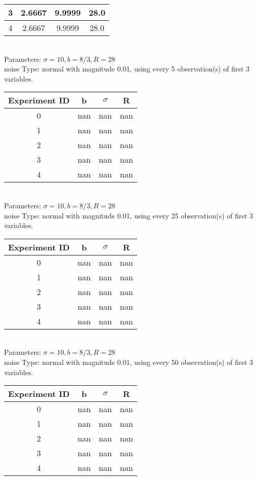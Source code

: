 \begin{multicols}{3}
\begin{tabular}{cccc}
 3 & 2.6667 & 9.9999 & 28.0\\ \hline 
 4 & 2.6667 & 9.9999 & 28.0\\ \hline 
 \end{tabular}\\
Parameters: $\sigma=10, b=8/3, R=28$\\
noise Type: normal with magnitude 0.01, using every 5 observation(s) of first 3 variables.\\
\begin{tabular}{cccc}
\hline Experiment ID & b & $\sigma$ & R \\ \hline 
0 & nan & nan & nan\\ \hline 
 1 & nan & nan & nan\\ \hline 
 2 & nan & nan & nan\\ \hline 
 3 & nan & nan & nan\\ \hline 
 4 & nan & nan & nan\\ \hline 
 \end{tabular}\\
Parameters: $\sigma=10, b=8/3, R=28$\\
noise Type: normal with magnitude 0.01, using every 25 observation(s) of first 3 variables.\\
\begin{tabular}{cccc}
\hline Experiment ID & b & $\sigma$ & R \\ \hline 
0 & nan & nan & nan\\ \hline 
 1 & nan & nan & nan\\ \hline 
 2 & nan & nan & nan\\ \hline 
 3 & nan & nan & nan\\ \hline 
 4 & nan & nan & nan\\ \hline 
 \end{tabular}\\
Parameters: $\sigma=10, b=8/3, R=28$\\
noise Type: normal with magnitude 0.01, using every 50 observation(s) of first 3 variables.\\
\begin{tabular}{cccc}
\hline Experiment ID & b & $\sigma$ & R \\ \hline 
0 & nan & nan & nan\\ \hline 
 1 & nan & nan & nan\\ \hline 
 2 & nan & nan & nan\\ \hline 
 3 & nan & nan & nan\\ \hline 
 4 & nan & nan & nan\\ \hline 

\end{tabular}
\end{multicols}
